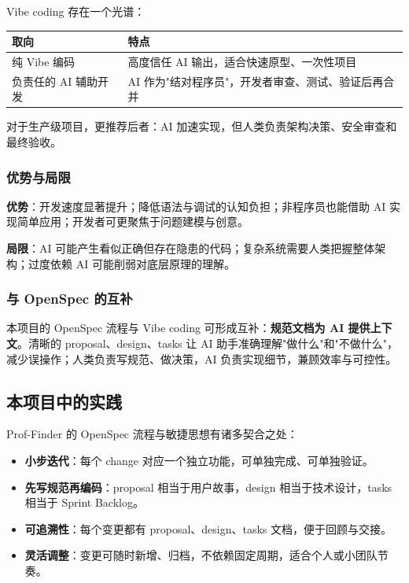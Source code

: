 \documentclass[11pt]{article}
\begin{document}
Vibe coding 存在一个光谱：

\begin{center}
\begin{tabular}{|l|l|}
\hline
\textbf{取向} & \textbf{特点} \\
\hline
纯 Vibe 编码 & 高度信任 AI 输出，适合快速原型、一次性项目 \\
\hline
负责任的 AI 辅助开发 & AI 作为"结对程序员"，开发者审查、测试、验证后再合并 \\
\hline
\end{tabular}
\end{center}

对于生产级项目，更推荐后者：AI 加速实现，但人类负责架构决策、安全审查和最终验收。

\subsubsection{优势与局限}

\textbf{优势}：开发速度显著提升；降低语法与调试的认知负担；非程序员也能借助 AI 实现简单应用；开发者可更聚焦于问题建模与创意。

\textbf{局限}：AI 可能产生看似正确但存在隐患的代码；复杂系统需要人类把握整体架构；过度依赖 AI 可能削弱对底层原理的理解。

\subsubsection{与 OpenSpec 的互补}

本项目的 OpenSpec 流程与 Vibe coding 可形成互补：\textbf{规范文档为 AI 提供上下文}。清晰的 proposal、design、tasks 让 AI 助手准确理解"做什么"和"不做什么"，减少误操作；人类负责写规范、做决策，AI 负责实现细节，兼顾效率与可控性。

\subsection{本项目中的实践}

Prof-Finder 的 OpenSpec 流程与敏捷思想有诸多契合之处：

\begin{itemize}
    \item \textbf{小步迭代}：每个 change 对应一个独立功能，可单独完成、可单独验证。
    \item \textbf{先写规范再编码}：proposal 相当于用户故事，design 相当于技术设计，tasks 相当于 Sprint Backlog。
    \item \textbf{可追溯性}：每个变更都有 proposal、design、tasks 文档，便于回顾与交接。
    \item \textbf{灵活调整}：变更可随时新增、归档，不依赖固定周期，适合个人或小团队节奏。
\end{itemize}
\end{document}
